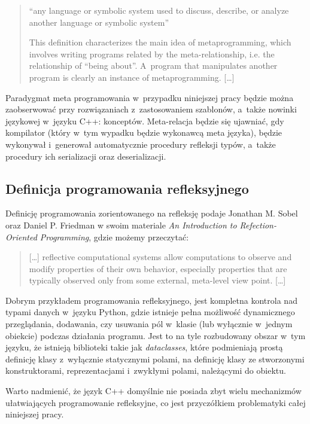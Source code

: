 \documentclass[12pt]{article}
\newcommand{\n}{\newline}
\newcommand{\nonpl}[1]{{\it #1}}
\begin{document}
{{\begin{quotation}
				“any language or symbolic system used to discuss, describe, or analyze another
					language or symbolic system”\n

					This definition characterizes the main idea of metaprogramming, which involves writing
				programs related by the meta-relationship, i.e. the relationship of “being about”. A~program that
				manipulates another program is clearly an instance of metaprogramming. [\ldots]
			\end{quotation}

			Paradygmat meta programowania w~przypadku niniejszej pracy będzie można zaobserwować przy
			rozwiązaniach z~zastosowaniem szablonów, a~także nowinki językowej w~języku C++: konceptów.
			Meta-relacja będzie się ujawniać, gdy kompilator (który w~tym wypadku będzie wykonawcą meta języka),
			będzie wykonywał i~generował automatycznie procedury refleksji typów, a~także procedury ich serializacji
			oraz deserializacji.\n
		}

		{
			\newpage
			\subsection{Definicja programowania refleksyjnego}

			Definicję programowania zorientowanego na refleksję podaje Jonathan M. Sobel oraz Daniel P. Friedman
			w swoim materiale \nonpl{An Introduction to Refection-Oriented Programming}\cite{reflection_definition},
			gdzie możemy przeczytać:

			\begin{quotation}
				[\ldots] reflective computational systems allow computations to observe and modify properties
				of their own behavior, especially properties that are typically observed only from some
				external, meta-level view point. [\ldots]
			\end{quotation}

			Dobrym przykładem programowania refleksyjnego, jest kompletna kontrola nad typami danych w~języku Python,
			gdzie istnieje pełna możliwość dynamicznego przeglądania, dodawania, czy usuwania pól w~klasie (lub wyłącznie w~jednym obiekcie)
			podczas działania programu. Jest to na tyle rozbudowany obszar w~tym języku, że istnieją biblioteki takie jak
			\nonpl{dataclasses}\cite{python_dataclass}, które podmieniają prostą definicję klasy z~wyłącznie statycznymi polami,
			na definicję klasy ze stworzonymi konstruktorami, reprezentacjami i~zwykłymi polami, należącymi do obiektu.

			Warto nadmienić, że język C++ domyślnie nie posiada zbyt wielu mechanizmów ułatwiających programowanie refleksyjne,
			co jest przyczółkiem problematyki całej niniejszej pracy.
		}
	}
\end{document}
